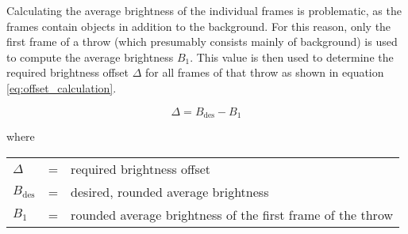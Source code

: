 Calculating the average brightness of the individual frames is problematic, as the frames contain objects in addition to the background. %
For this reason, only the first frame of a throw (which presumably consists mainly of background) is used to compute the average brightness $B_1$.
This value is then used to determine the required brightness offset $\Delta$ for all frames of that throw as shown in equation \ref{eq:offset_calculation}. %

\begin{equation}
  \Delta = B_{\text{des}} - B_1
  \label{eq:offset_calculation}
\end{equation}

where

\begin{tabular}{lll}
  $\Delta$ & = & required brightness offset \\
  $B_{\text{des}}$ & = & desired, rounded average brightness \\
  $B_1$ & = & rounded average brightness of the first frame of the throw \\
\end{tabular}
\\

